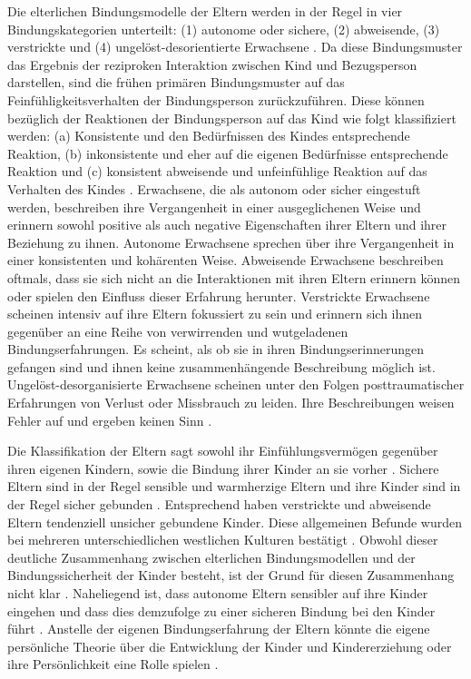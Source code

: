 Die elterlichen Bindungsmodelle der Eltern werden in der Regel in vier Bindungskategorien unterteilt: (1) autonome oder sichere, (2) abweisende, (3) verstrickte und (4) ungelöst-desorientierte Erwachsene \cite[S.~593ff]{Siegler2008}. Da diese Bindungsmuster das Ergebnis der reziproken Interaktion zwischen Kind und Bezugsperson darstellen, sind die frühen primären Bindungsmuster auf das Feinfühligkeitsverhalten der Bindungsperson zurückzuführen. Diese können bezüglich der Reaktionen der Bindungsperson auf das Kind wie folgt klassifiziert werden: (a) Konsistente und den Bedürfnissen des Kindes entsprechende Reaktion, (b) inkonsistente und eher auf die eigenen Bedürfnisse entsprechende Reaktion und (c) konsistent abweisende und unfeinfühlige Reaktion auf das Verhalten des Kindes \cite{Schmidt2004}. 
Erwachsene, die als autonom oder sicher eingestuft werden, beschreiben ihre Vergangenheit in einer ausgeglichenen Weise und erinnern sowohl positive als auch negative Eigenschaften ihrer Eltern und ihrer Beziehung zu ihnen. Autonome Erwachsene sprechen über ihre Vergangenheit in einer konsistenten und kohärenten Weise. Abweisende Erwachsene beschreiben oftmals, dass sie sich nicht an die Interaktionen mit ihren Eltern erinnern können oder spielen den Einfluss dieser Erfahrung herunter. Verstrickte Erwachsene scheinen intensiv auf ihre Eltern fokussiert zu sein und erinnern sich ihnen gegenüber an eine Reihe von verwirrenden und wutgeladenen Bindungserfahrungen. Es scheint, als ob sie in ihren Bindungserinnerungen gefangen sind und ihnen keine zusammenhängende Beschreibung möglich ist. Ungelöst-desorganisierte Erwachsene scheinen unter den Folgen posttraumatischer Erfahrungen von Verlust oder Missbrauch zu leiden. Ihre Beschreibungen weisen Fehler auf und ergeben keinen Sinn \cite{Schmidt2004}.

Die Klassifikation der Eltern sagt sowohl ihr Einfühlungsvermögen gegenüber ihren eigenen Kindern, sowie die Bindung ihrer Kinder an sie vorher \cite{Siegler2008}. Sichere Eltern sind in der Regel sensible und warmherzige Eltern und ihre Kinder sind in der Regel sicher gebunden \cite{Magai2000, Steele1996}. Entsprechend haben verstrickte und abweisende Eltern tendenziell unsicher gebundene Kinder. Diese allgemeinen Befunde wurden bei mehreren unterschiedlichen westlichen Kulturen bestätigt \cite{Hesse1999}. Obwohl dieser deutliche Zusammenhang zwischen elterlichen Bindungsmodellen und der Bindungssicherheit der Kinder besteht, ist der Grund für diesen Zusammenhang nicht klar \cite{Siegler2008}. Naheliegend ist, dass autonome Eltern sensibler auf ihre Kinder eingehen und dass dies demzufolge zu einer sicheren Bindung bei den Kinder führt \cite{Pederson1998}. Anstelle der eigenen Bindungserfahrung der Eltern könnte die eigene persönliche Theorie über die Entwicklung der Kinder und Kindererziehung oder ihre Persönlichkeit  eine Rolle spielen \cite{Thompson1998}.

